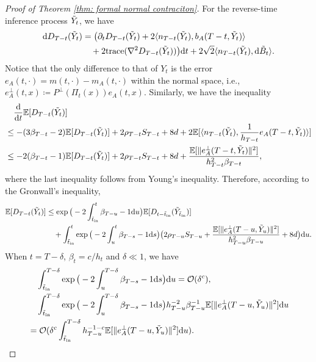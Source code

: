 \documentclass[11pt]{article}
\newcommand{\mb}{\mathbb}
\newcommand{\dee}{\mathrm{d}}
\newcommand{\mc}{\mathcal}
\newcommand{\Tr}{\mathrm{trace}}
\begin{document}
\begin{proof}[Proof of Theorem \ref{thm: formal normal contraciton}]
\noindent For the reverse-time inference process $\Tilde{Y}_t$, we have
\begin{align*}
    \dee D_{T-t}(\Tilde{Y}_t) &= \big( \partial_t D_{T-t}(\Tilde{Y}_t) + 2\langle n_{T-t}(\Tilde{Y}_t), b_A(T-t,\Tilde{Y}_t) \rangle \\
    &\quad + 2\Tr(\nabla^2 D_{T-t}(\Tilde{Y}_t))\big)\dee t + 2\sqrt{2}\langle n_{T-t}(\Tilde{Y}_t),\dee \Tilde{B}_t \rangle.
\end{align*}
Notice that the only difference to that of $Y_t$ is the error $e_A(t,\cdot)=m(t,\cdot)-m_A(t,\cdot)$ within the normal space, i.e., $e_A^\perp(t,x)\coloneqq P^\perp(\Pi_t(x)) e_A(t,x)$. Similarly, we have the inequality
\begin{align*}
     &\quad \frac{\dee}{\dee t}\mb{E}[D_{T-t}(\Tilde{Y}_t)] \\
     &\le -(3\beta_{T-t}-2)\mb{E}[D_{T-t}(\Tilde{Y}_t)] + 2\rho_{T-t}S_{T-t} + 8d + 2\mb{E}[\langle n_{T-t}(\Tilde{Y}_t), \frac{1}{h_{T-t}}e_A(T-t,\Tilde{Y}_t) \rangle]\\
      &\le -2(\beta_{T-t}-1)\mb{E}[D_{T-t}(\Tilde{Y}_t)] + 2\rho_{T-t}S_{T-t} + 8d + \frac{\mb{E}[\| e_A^\perp(T-t,\Tilde{Y}_t)\|^2]}{h_{T-t}^2\beta_{T-t}},
\end{align*}
where the last inequality follows from Young's inequality. Therefore, according to the Gronwall's inequality,
\begin{align*}
    \mb{E}[D_{T-t}(\Tilde{Y}_t)] & \le  \exp\big( -2\int_{\Tilde{t}_{\mathrm{in}}}^t \beta_{T-u}-1 \dee u \big)\mb{E}[D_{t-\Tilde{t}_{\mathrm{in}}}(\Tilde{Y}_{\Tilde{t}_{\mathrm{in}}})] \\
    &\quad + \int_{\Tilde{t}_{\mathrm{in}}}^t \exp\big( -2\int_{u}^t \beta_{T-s}-1 \dee s \big) \big( 2\rho_{T-u}S_{T-u}+\frac{\mb{E}[\| e_A^\perp(T-u,\Tilde{Y}_u)\|^2]}{h_{T-u}^2\beta_{T-u}}+ 8d \big) \dee u .
\end{align*}
When $t=T-\delta$, $\beta_t=c/h_t$ and $\delta\ll 1$, we have
\begin{align*}
    &\quad\int_{\Tilde{t}_{\mathrm{in}}}^{T-\delta} \exp\big( -2\int_{u}^{T-\delta} \beta_{T-s}-1 \dee s \big) \dee u =\mc{O}(\delta^c) ,\\
    &\quad\int_{\Tilde{t}_{\mathrm{in}}}^{T-\delta} \exp\big( -2\int_{u}^{T-\delta} \beta_{T-s}-1 \dee s \big) h_{T-u}^{-2}\beta_{T-u}^{-1}\mb{E}[\| e_A^\perp(T-u,\Tilde{Y}_u)\|^2] \dee u \\
    & =\mc{O}(\delta^c \int_{\Tilde{t}_{\mathrm{in}}}^{T-\delta}  h_{T-u}^{-1-c}\mb{E}[\| e_A^\perp(T-u,\Tilde{Y}_u)\|^2] \dee u ) .
\end{align*}
\end{proof}
\end{document}
